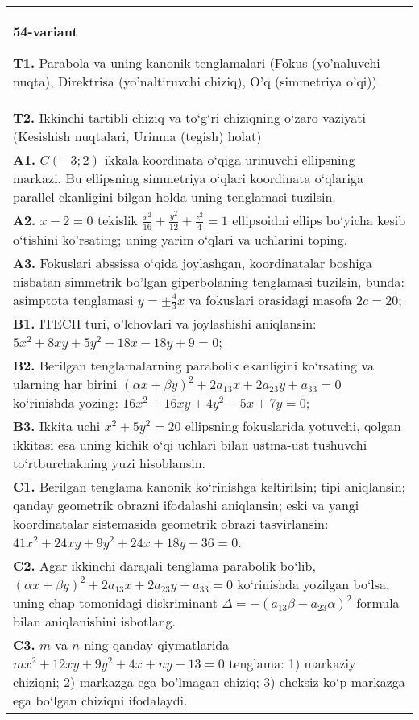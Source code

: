 \documentclass{article}
\begin{document}
\begin{tabular}{m{17cm}}
\textbf{54-variant}
\newline

\textbf{T1.} Parabola va uning kanonik tenglamalari (Fokus (yo’naluvchi nuqta), Direktrisa (yo’naltiruvchi chiziq), O’q (simmetriya o’qi)) \\
\textbf{T2.} Ikkinchi tartibli chiziq va to‘g‘ri chiziqning o‘zaro vaziyati (Kesishish nuqtalari, Urinma (tegish) holat) \\
\textbf{A1.} $C (-3; 2) $ ikkala koordinata o‘qiga urinuvchi ellipsning markazi. Bu ellipsning simmetriya o‘qlari koordinata o‘qlariga parallel ekanligini bilgan holda uning tenglamasi tuzilsin. \\
\textbf{A2.} $x-2=0$ tekislik $\frac{x^2}{16}+\frac{y^2}{12}+\frac{z^2}{4}=1$ ellipsoidni ellips bo‘yicha kesib o‘tishini ko'rsating; uning yarim o‘qlari va uchlarini toping. \\
\textbf{A3.} Fokuslari abssissa o‘qida joylashgan, koordinatalar boshiga nisbatan simmetrik bo'lgan giperbolaning tenglamasi tuzilsin, bunda: asimptota tenglamasi $y= \pm \frac{4}{3} x$ va fokuslari orasidagi masofa $2 c=20$; \\
\textbf{B1.} ITECH turi, o'lchovlari va joylashishi aniqlansin: $5 x^2+8 x y+5 y^2-18 x-18 y+9=0$; \\
\textbf{B2.} Berilgan tenglamalarning parabolik ekanligini ko‘rsating va ularning har birini $(\alpha x+\beta y)^2+2 a_{13} x+2 a_{23} y+a_{33}=0$ ko‘rinishda yozing: $16 x^2+16 x y+4 y^2-5 x+7 y=0$; \\
\textbf{B3.} Ikkita uchi $x^2+5 y^2=20$ ellipsning fokuslarida yotuvchi, qolgan ikkitasi esa uning kichik o‘qi uchlari bilan ustma-ust tushuvchi to‘rtburchakning yuzi hisoblansin. \\
\textbf{C1.} Berilgan tenglama kanonik ko‘rinishga keltirilsin; tipi aniqlansin; qanday geometrik obrazni ifodalashi aniqlansin; eski va yangi koordinatalar sistemasida geometrik obrazi tasvirlansin: $41 x^2+24 x y+9 y^2+24 x+18 y-36=0$. \\
\textbf{C2.} Agar ikkinchi darajali tenglama parabolik bo‘lib, $ (\alpha x+\beta y) ^2+2a_{13}x+2a_{23}y+a_{33}=0$ ko‘rinishda yozilgan bo‘lsa, uning chap tomonidagi diskriminant $\Delta=- (a_{13} \beta-a_{23} \alpha) ^2$ formula bilan aniqlanishini isbotlang. \\
\textbf{C3.} $m$ va $n$ ning qanday qiymatlarida $m x^2+12 x y+9 y^2+4 x+n y-13=0$ tenglama: 1) markaziy chiziqni; 2) markazga ega bo'lmagan chiziq; 3) cheksiz ko‘p markazga ega bo‘lgan chiziqni ifodalaydi. \\

\end{tabular}
\vspace{1cm}
\end{document}
